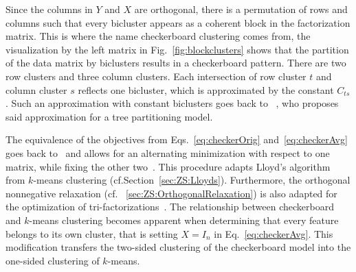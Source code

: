 Since the columns in $Y$ and $X$ are orthogonal, there is a permutation of rows and columns such that every bicluster appears as a coherent block in the factorization matrix. This is where the name checkerboard clustering comes from, the visualization by the left matrix in Fig.~\ref{fig:blockclusters} shows that the partition of the data matrix by biclusters results in a checkerboard pattern. There are two row clusters and three column clusters. Each intersection of row cluster $t$ and column cluster $s$ reflects one bicluster, which is approximated by the constant $C_{ts}$. Such an approximation with constant biclusters goes back to ~\cite{hartigan1972direct}, who proposes said approximation for a tree partitioning model.

The equivalence of the objectives from Eqs.~\eqref{eq:checkerOrig} and~\eqref{eq:checkerAvg}  goes back to~\cite{gaul1996new} and allows for an alternating minimization with respect to one matrix, while fixing the other two~\citep{maurizio2001double,wang2011fast,cho2004minimum}. This procedure adapts Lloyd's algorithm from $k$-means clustering (cf.\@ Section~\ref{sec:ZS:Lloyds}). Furthermore, the orthogonal nonnegative relaxation (cf. \@Section~\ref{sec:ZS:OrthogonalRelaxation}) is also adapted for the optimization of tri-factorizations~\citep{ding2006orthogonal, yoo2010orthogonal}. The relationship between checkerboard and $k$-means clustering becomes apparent when determining that every feature belongs to its own cluster, that is setting $X=I_n$ in Eq.~\eqref{eq:checkerAvg}. This modification transfers the two-sided clustering of the checkerboard model into the one-sided clustering of $k$-means. 
